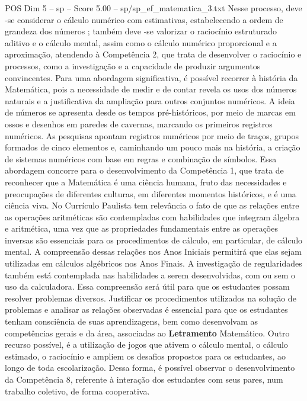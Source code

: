 \begin{textsample}{POS Dim 5 – sp – Score 5.00 – sp/sp\_ef\_matematica\_3.txt}
Nesse processo, deve -se considerar o cálculo numérico com estimativas, estabelecendo a ordem de grandeza dos números ; também deve -se valorizar o raciocínio estruturado aditivo e o cálculo mental, assim como o cálculo numérico proporcional e a aproximação, atendendo à Competência 2, que trata de desenvolver o raciocínio e processos, como a investigação e a capacidade de produzir argumentos convincentes.
Para uma abordagem significativa, é possível recorrer à história da Matemática, pois a necessidade de medir e de contar revela os usos dos números naturais e a justificativa da ampliação para outros conjuntos numéricos.
A ideia de números se apresenta desde os tempos pré-históricos, por meio de marcas em ossos e desenhos em paredes de cavernas, marcando os primeiros registros numéricos.
As pesquisas apontam registros numéricos por meio de traços, grupos formados de cinco elementos e, caminhando um pouco mais na história, a criação de sistemas numéricos com base em regras e combinação de símbolos.
Essa abordagem concorre para o desenvolvimento da Competência 1, que trata de reconhecer que a Matemática é uma ciência humana, fruto das necessidades e preocupações de diferentes culturas, em diferentes momentos históricos, e é uma ciência viva.
No Currículo Paulista tem relevância o fato de que as relações entre as operações aritméticas são contempladas com habilidades que integram álgebra e aritmética, uma vez que as propriedades fundamentais entre as operações inversas são essenciais para os procedimentos de cálculo, em particular, de cálculo mental.
A compreensão dessas relações nos Anos Iniciais permitirá que elas sejam utilizadas em cálculos algébricos nos Anos Finais.
A investigação de regularidades também está contemplada nas habilidades a serem desenvolvidas, com ou sem o uso da calculadora.
Essa compreensão será útil para que os estudantes possam resolver problemas diversos.
Justificar os procedimentos utilizados na solução de problemas e analisar as relações observadas é essencial para que os estudantes tenham consciência de suas aprendizagens, bem como desenvolvam as competências gerais e da área, associadas ao \textbf{Letramento} Matemático.
Outro recurso possível, é a utilização de jogos que ativem o cálculo mental, o cálculo estimado, o raciocínio e ampliem os desafios propostos para os estudantes, ao longo de toda escolarização.
Dessa forma, é possível observar o desenvolvimento da Competência 8, referente à interação dos estudantes com seus pares, num trabalho coletivo, de forma cooperativa.

\end{textsample}
